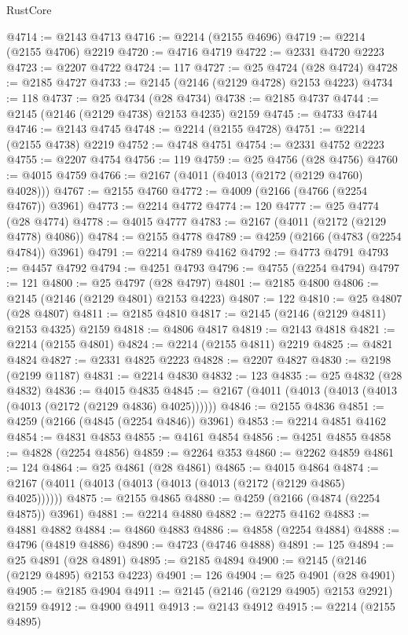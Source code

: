 \begin{lexlean}{RustCore}
\begin{coremodule}
@4714 := @2143 @4713
@4716 := @2214 (@2155 @4696)
@4719 := @2214 (@2155 @4706) @2219
@4720 := @4716 @4719
@4722 := @2331 @4720 @2223
@4723 := @2207 @4722
@4724 := 117
@4727 := @25 @4724 (@28 @4724)
@4728 := @2185 @4727
@4733 := @2145 (@2146 (@2129 @4728) @2153 @4223)
@4734 := 118
@4737 := @25 @4734 (@28 @4734)
@4738 := @2185 @4737
@4744 := @2145 (@2146 (@2129 @4738) @2153 @4235) @2159
@4745 := @4733 @4744
@4746 := @2143 @4745
@4748 := @2214 (@2155 @4728)
@4751 := @2214 (@2155 @4738) @2219
@4752 := @4748 @4751
@4754 := @2331 @4752 @2223
@4755 := @2207 @4754
@4756 := 119
@4759 := @25 @4756 (@28 @4756)
@4760 := @4015 @4759
@4766 := @2167 (@4011 (@4013 (@2172 (@2129 @4760) @4028)))
@4767 := @2155 @4760
@4772 := @4009 (@2166 (@4766 (@2254 @4767)) @3961)
@4773 := @2214 @4772
@4774 := 120
@4777 := @25 @4774 (@28 @4774)
@4778 := @4015 @4777
@4783 := @2167 (@4011 (@2172 (@2129 @4778) @4086))
@4784 := @2155 @4778
@4789 := @4259 (@2166 (@4783 (@2254 @4784)) @3961)
@4791 := @2214 @4789 @4162
@4792 := @4773 @4791
@4793 := @4457 @4792
@4794 := @4251 @4793
@4796 := @4755 (@2254 @4794)
@4797 := 121
@4800 := @25 @4797 (@28 @4797)
@4801 := @2185 @4800
@4806 := @2145 (@2146 (@2129 @4801) @2153 @4223)
@4807 := 122
@4810 := @25 @4807 (@28 @4807)
@4811 := @2185 @4810
@4817 := @2145 (@2146 (@2129 @4811) @2153 @4325) @2159
@4818 := @4806 @4817
@4819 := @2143 @4818
@4821 := @2214 (@2155 @4801)
@4824 := @2214 (@2155 @4811) @2219
@4825 := @4821 @4824
@4827 := @2331 @4825 @2223
@4828 := @2207 @4827
@4830 := @2198 (@2199 @1187)
@4831 := @2214 @4830
@4832 := 123
@4835 := @25 @4832 (@28 @4832)
@4836 := @4015 @4835
@4845 := @2167 (@4011 (@4013 (@4013 (@4013 (@4013 (@2172 (@2129 @4836) @4025))))))
@4846 := @2155 @4836
@4851 := @4259 (@2166 (@4845 (@2254 @4846)) @3961)
@4853 := @2214 @4851 @4162
@4854 := @4831 @4853
@4855 := @4161 @4854
@4856 := @4251 @4855
@4858 := @4828 (@2254 @4856)
@4859 := @2264 @353
@4860 := @2262 @4859
@4861 := 124
@4864 := @25 @4861 (@28 @4861)
@4865 := @4015 @4864
@4874 := @2167 (@4011 (@4013 (@4013 (@4013 (@4013 (@2172 (@2129 @4865) @4025))))))
@4875 := @2155 @4865
@4880 := @4259 (@2166 (@4874 (@2254 @4875)) @3961)
@4881 := @2214 @4880
@4882 := @2275 @4162
@4883 := @4881 @4882
@4884 := @4860 @4883
@4886 := @4858 (@2254 @4884)
@4888 := @4796 (@4819 @4886)
@4890 := @4723 (@4746 @4888)
@4891 := 125
@4894 := @25 @4891 (@28 @4891)
@4895 := @2185 @4894
@4900 := @2145 (@2146 (@2129 @4895) @2153 @4223)
@4901 := 126
@4904 := @25 @4901 (@28 @4901)
@4905 := @2185 @4904
@4911 := @2145 (@2146 (@2129 @4905) @2153 @2921) @2159
@4912 := @4900 @4911
@4913 := @2143 @4912
@4915 := @2214 (@2155 @4895)

\end{coremodule}
\end{lexlean}
